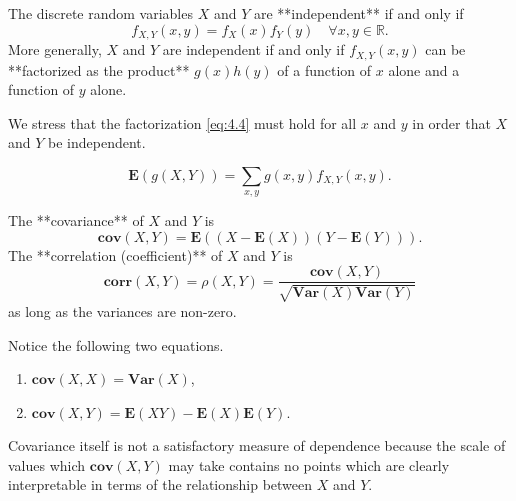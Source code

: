 \begin{lemma}
The discrete random variables $X$ and $Y$ are **independent** if and only if 
\begin{equation}
    \label{eq:4.4}
    \tag{4-4}
    f_{X,Y}(x,y) = f_X(x)f_Y(y) \quad \forall x,y \in \mathbb{R}.
\end{equation}
More generally, $X$ and $Y$ are independent if and only if $f_{X,Y}(x, y)$ can be **factorized as the product** $g(x)h (y)$ of a function of $x$ alone and a function of $y$ alone. 
\end{lemma}
\begin{remark}
We stress that the factorization \eqref{eq:4.4} must hold for all $x$ and $y$ in order that $X$ and $Y$ be independent. 
\end{remark}

\begin{lemma}
\begin{equation*}
    \mathbf{E}(g(X, Y))=\sum_{x, y} g(x, y) f_{X, Y}(x, y).
\end{equation*}
\end{lemma}

\begin{definition}
The **covariance** of $X$ and $Y$ is
\begin{equation*}
    \mathbf{cov}(X,Y) = \mathbf{E}\left( (X-\mathbf{E}(X))(Y-\mathbf{E}(Y)) \right).
\end{equation*}
The **correlation (coefficient)** of $X$ and $Y$ is 
\begin{equation*}
\mathbf{corr}(X, Y) = \rho(X,Y) = \frac{\mathbf{cov}(X,Y)}{\sqrt{\mathbf{Var}(X)\mathbf{Var}(Y)}}
\end{equation*}
as long as the variances are non-zero. 
\end{definition}

\begin{remark}
Notice the following two equations.
\begin{enumerate}
    \item $\mathbf{cov}(X,X) = \mathbf{Var}(X)$,
    \item $\mathbf{cov}(X,Y) = \mathbf{E}(XY) - \mathbf{E}(X)\mathbf{E}(Y)$.
\end{enumerate}
\end{remark}

Covariance itself is not a satisfactory measure of dependence because the scale of values which $\mathbf{cov}(X, Y)$ may take contains no points which are clearly interpretable in terms of the relationship between $X$ and $Y$.

